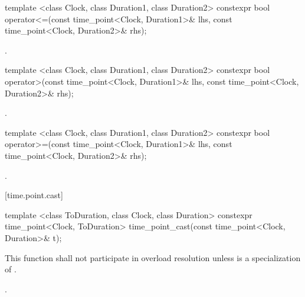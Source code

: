 %
\begin{itemdecl}
template <class Clock, class Duration1, class Duration2>
  constexpr bool operator<=(const time_point<Clock, Duration1>& lhs, const time_point<Clock, Duration2>& rhs);
\end{itemdecl}

\begin{itemdescr}
\pnum
\returns {}.
\end{itemdescr}

%
\begin{itemdecl}
template <class Clock, class Duration1, class Duration2>
  constexpr bool operator>(const time_point<Clock, Duration1>& lhs, const time_point<Clock, Duration2>& rhs);
\end{itemdecl}

\begin{itemdescr}
\pnum
\returns {}.
\end{itemdescr}

%
\begin{itemdecl}
template <class Clock, class Duration1, class Duration2>
  constexpr bool operator>=(const time_point<Clock, Duration1>& lhs, const time_point<Clock, Duration2>& rhs);
\end{itemdecl}

\begin{itemdescr}
\pnum
\returns {}.
\end{itemdescr}

[time.point.cast]{}

%
%
\begin{itemdecl}
template <class ToDuration, class Clock, class Duration>
  constexpr time_point<Clock, ToDuration>
  time_point_cast(const time_point<Clock, Duration>& t);
\end{itemdecl}

\begin{itemdescr}
\pnum
\remarks This function shall not participate in overload resolution
unless  is a specialization of .

\pnum
\returns {}.
\end{itemdescr}

